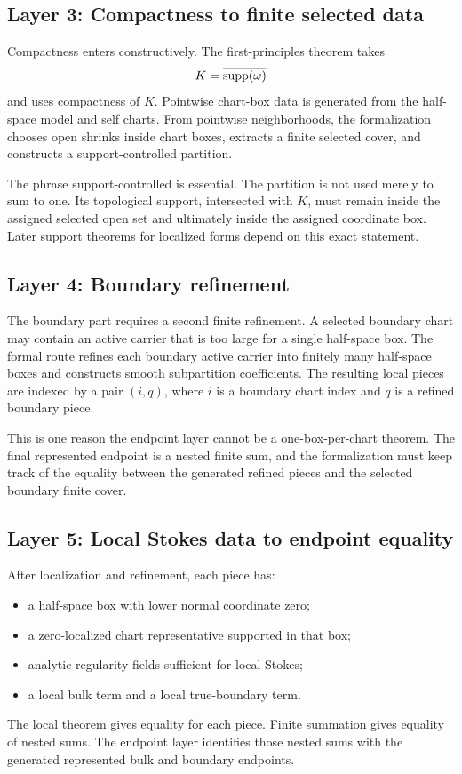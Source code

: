 \subsection{Layer 3: Compactness to finite selected data}

Compactness enters constructively.  The first-principles theorem takes
\[
  K = \overline{\operatorname{supp}(\omega)}
\]
and uses compactness of \(K\).  Pointwise chart-box data is generated from the
half-space model and self charts.  From pointwise neighborhoods, the
formalization chooses open shrinks inside chart boxes, extracts a finite
selected cover, and constructs a support-controlled partition.

The phrase support-controlled is essential.  The partition is not used merely
to sum to one.  Its topological support, intersected with \(K\), must remain
inside the assigned selected open set and ultimately inside the assigned
coordinate box.  Later support theorems for localized forms depend on this
exact statement.

\subsection{Layer 4: Boundary refinement}

The boundary part requires a second finite refinement.  A selected boundary
chart may contain an active carrier that is too large for a single half-space
box.  The formal route refines each boundary active carrier into finitely many
half-space boxes and constructs smooth subpartition coefficients.  The
resulting local pieces are indexed by a pair \((i,q)\), where \(i\) is a
boundary chart index and \(q\) is a refined boundary piece.

This is one reason the endpoint layer cannot be a one-box-per-chart theorem.
The final represented endpoint is a nested finite sum, and the formalization
must keep track of the equality between the generated refined pieces and the
selected boundary finite cover.

\subsection{Layer 5: Local Stokes data to endpoint equality}

After localization and refinement, each piece has:
\begin{itemize}
  \item a half-space box with lower normal coordinate zero;
  \item a zero-localized chart representative supported in that box;
  \item analytic regularity fields sufficient for local Stokes;
  \item a local bulk term and a local true-boundary term.
\end{itemize}
The local theorem gives equality for each piece.  Finite summation gives
equality of nested sums.  The endpoint layer identifies those nested sums with
the generated represented bulk and boundary endpoints.

